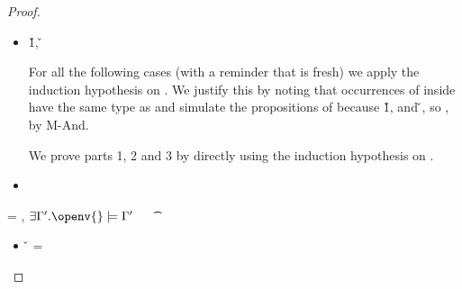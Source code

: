 \begin{lemma}
\begin{proof}
\begin{case}[T-Let]
  \begin{itemize}
    \item[]
      \begin{subcase}[B-Let]
        \opsem {\openv{}} {} {\v{1}},
         {} {\v{}}

        For all the following cases (with a reminder that \x{} is fresh)
        we apply the induction hypothesis on . We justify this by noting
        that occurrences of \x{} inside  have the same type as  and 
        simulate the propositions of 
        because 
        \opsem {\openv{}} {} {\v{1}},
        and
         {} {\v{}},
        so \satisfies{\openv{}}{\propenv{}, {\isprop {\s{}} {\x{}}}, \propp{}, \proppp{}},
        by M-And.

        We prove parts 1, 2 and 3 by directly using the induction hypothesis on .
      \end{subcase}
    \item[]
      \begin{subcase}[BE-Let]
      \end{subcase}
  \end{itemize}
\end{case}

\begin{case}[T-Clos] \e{} = {\closure {\openv{}} {\abs {\x{}} {\s{}} {}}},
  {\thenprop {\prop{}}}
  $\exists {\propenvp{}}. \satisfies{\openv{}}{\propenvp{}}$
  \ \ 
\judgement {\propenvp{}} { {\t{}}}
                 {\filterset {\thenprop {\prop{}}}
                             {\elseprop {\prop{}}}}
                 {\object{}}

  \begin{itemize}
    \item[]
      \begin{subcase}[B-Abs] \v{} = {\closure {\openv{}} {\abs {\x{}} {\s{}} {}}}


\end{subcase}
\end{itemize}
\end{case}
\end{proof}
\end{lemma}
